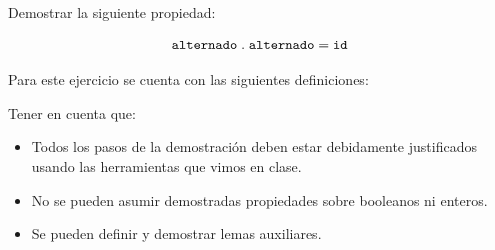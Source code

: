 Demostrar la siguiente propiedad:

$$\texttt{alternado} \; . \; \texttt{alternado} = \texttt{id}$$

Para este ejercicio se cuenta con las siguientes definiciones:


Tener en cuenta que:

\begin{itemize}
    \item Todos los pasos de la demostración deben estar debidamente justificados usando las herramientas que vimos en clase.
    \item No se pueden asumir demostradas propiedades sobre booleanos ni enteros.
    \item Se pueden definir y demostrar lemas auxiliares.
\end{itemize}

